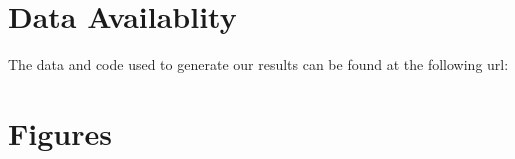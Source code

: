 \documentclass[11pt,letterpaper]{article} %
\begin{document}
\section*{Data Availablity}
The data and code used to generate our results can be found at the following url: 





\section*{Figures}



\end{document}
